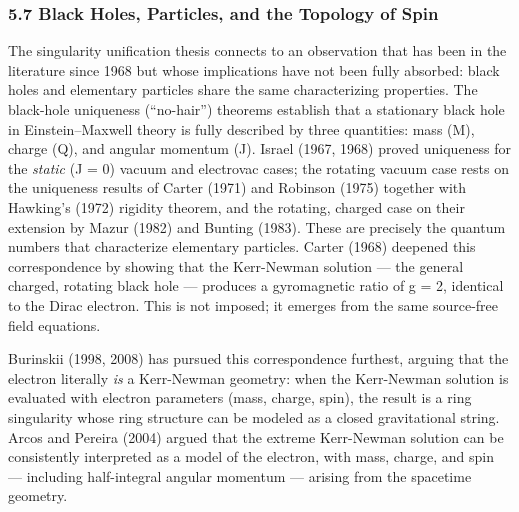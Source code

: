 \documentclass[
]{article}
\begin{document}
\hypertarget{black-holes-particles-and-the-topology-of-spin}{%
\subsubsection{5.7 Black Holes, Particles, and the Topology of
Spin}\label{black-holes-particles-and-the-topology-of-spin}}

The singularity unification thesis connects to an observation that has
been in the literature since 1968 but whose implications have not been
fully absorbed: black holes and elementary particles share the same
characterizing properties. The black-hole uniqueness (``no-hair'')
theorems establish that a stationary black hole in Einstein--Maxwell
theory is fully described by three quantities: mass (M), charge (Q), and
angular momentum (J). Israel (1967, 1968) proved uniqueness for the
\emph{static} (J = 0) vacuum and electrovac cases; the rotating vacuum
case rests on the uniqueness results of Carter (1971) and Robinson
(1975) together with Hawking's (1972) rigidity theorem, and the
rotating, charged case on their extension by Mazur (1982) and Bunting
(1983). These are precisely the quantum numbers that characterize
elementary particles. Carter (1968) deepened this correspondence by
showing that the Kerr-Newman solution --- the general charged, rotating
black hole --- produces a gyromagnetic ratio of g = 2, identical to the
Dirac electron. This is not imposed; it emerges from the same
source-free field equations.

Burinskii (1998, 2008) has pursued this correspondence furthest, arguing
that the electron literally \emph{is} a Kerr-Newman geometry: when the
Kerr-Newman solution is evaluated with electron parameters (mass,
charge, spin), the result is a ring singularity whose ring structure can
be modeled as a closed gravitational string. Arcos and Pereira (2004)
argued that the extreme Kerr-Newman solution can be consistently
interpreted as a model of the electron, with mass, charge, and spin ---
including half-integral angular momentum --- arising from the spacetime
geometry.
\end{document}
